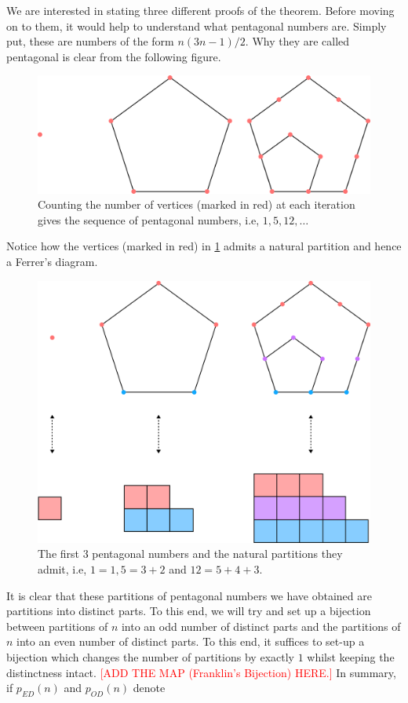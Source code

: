 We are interested in stating three different proofs of the theorem. Before moving on to them, it would help to understand what pentagonal numbers are. Simply put, these are numbers of the form $n(3n-1)/2$. Why they are called pentagonal is clear from the following figure.
\begin{figure}[H]
    \centering
    \includegraphics[width=0.8\linewidth]{Images/Figure20.png}
    \caption{Counting the number of vertices (marked in red) at each iteration gives the sequence of pentagonal numbers, i.e, $1,5,12,\ldots$}
    \label{f:PNT}
\end{figure}
Notice how the vertices (marked in red) in \cref{f:PNT} admits a natural partition and hence a Ferrer's diagram. 
\begin{figure}[H]
    \centering
    \includegraphics[width=0.8\linewidth]{Images/Figure21.png}
    \caption{The first $3$ pentagonal numbers and the natural partitions they admit, i.e, $1=1, 5=3+2$ and $12=5+4+3$.}
\end{figure}
It is clear that these partitions of pentagonal numbers we have obtained are partitions into distinct parts. To this end, we will try and set up a bijection between partitions of $n$ into an odd number of distinct parts and the partitions of $n$ into an even number of distinct parts. To this end, it suffices to set-up a bijection which changes the number of partitions by exactly $1$ whilst keeping the distinctness intact. \textcolor{red}{[ADD THE MAP (Franklin's Bijection) HERE.]} In summary, if $p_{ED}(n)$ and $p_{OD}(n)$ denote
